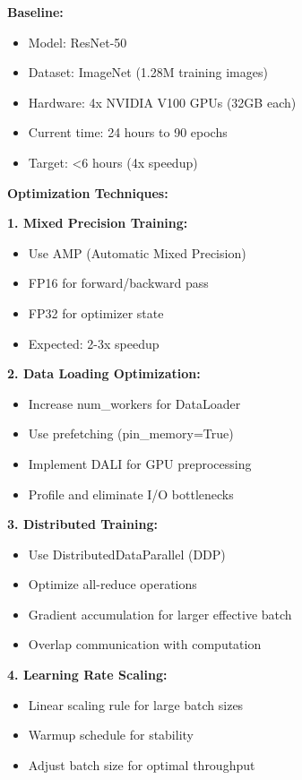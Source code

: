 \textbf{Baseline:}
\begin{itemize}
    \item Model: ResNet-50
    \item Dataset: ImageNet (1.28M training images)
    \item Hardware: 4x NVIDIA V100 GPUs (32GB each)
    \item Current time: 24 hours to 90 epochs
    \item Target: <6 hours (4x speedup)
\end{itemize}

\textbf{Optimization Techniques:}

\textbf{1. Mixed Precision Training:}
\begin{itemize}
    \item Use AMP (Automatic Mixed Precision)
    \item FP16 for forward/backward pass
    \item FP32 for optimizer state
    \item Expected: 2-3x speedup
\end{itemize}

\textbf{2. Data Loading Optimization:}
\begin{itemize}
    \item Increase num\_workers for DataLoader
    \item Use prefetching (pin\_memory=True)
    \item Implement DALI for GPU preprocessing
    \item Profile and eliminate I/O bottlenecks
\end{itemize}

\textbf{3. Distributed Training:}
\begin{itemize}
    \item Use DistributedDataParallel (DDP)
    \item Optimize all-reduce operations
    \item Gradient accumulation for larger effective batch
    \item Overlap communication with computation
\end{itemize}

\textbf{4. Learning Rate Scaling:}
\begin{itemize}
    \item Linear scaling rule for large batch sizes
    \item Warmup schedule for stability
    \item Adjust batch size for optimal throughput
\end{itemize}

